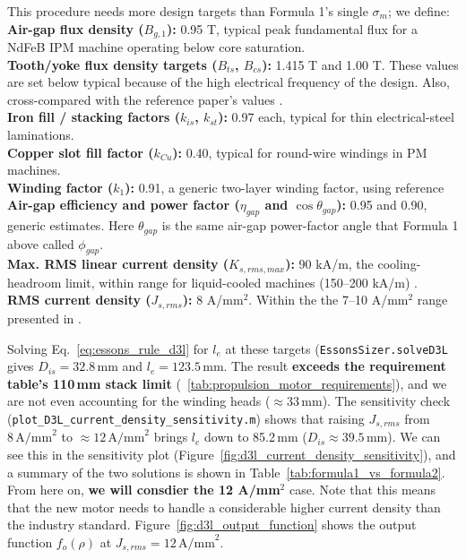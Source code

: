 \documentclass[10pt,final,journal,a4paper,oneside,twocolumn]{IEEEtran}
\begin{document}
This procedure needs more design targets than Formula 1's single $\sigma_m$; we define:
\\\textbf{Air-gap flux density ($B_{g,1}$):} 0.95 T, typical peak fundamental flux for a NdFeB IPM machine operating below core saturation.
\\\textbf{Tooth/yoke flux density targets ($B_{ts}$, $B_{cs}$):} 1.415 T and 1.00 T. These values are set below typical because of the high electrical frequency of the design. Also, cross-compared with the reference paper's values \cite{DiGerlandoRicca2022}.
\\\textbf{Iron fill / stacking factors ($k_{is}$, $k_{st}$):} 0.97 each, typical for thin electrical-steel laminations.
\\\textbf{Copper slot fill factor ($k_{Cu}$):} 0.40, typical for round-wire windings in PM machines.
\\\textbf{Winding factor ($k_1$):} 0.91, a generic two-layer winding factor, using reference
\\\textbf{Air-gap efficiency and power factor ($\eta_{gap}$ and $\cos\theta_{gap}$):} 0.95 and 0.90, generic estimates. Here $\theta_{gap}$ is the same air-gap power-factor angle that Formula 1 above called $\phi_{gap}$.
\\\textbf{Max. RMS linear current density ($K_{s,rms,max}$):} 90 kA/m, the cooling-headroom limit, within range for liquid-cooled machines (150--200 kA/m) \cite{LucaLecture6}.
\\\textbf{RMS current density ($J_{s,rms}$):} 8 A/mm$^2$. Within the the 7--10 A/mm$^2$ range presented in \cite{LucaLecture6}.

Solving Eq.~\ref{eq:essons_rule_d3l} for $l_e$ at these targets (\texttt{EssonsSizer.solveD3L} gives $D_{is}=32.8\,\text{mm}$ and $l_e=123.5\,\text{mm}$. The result \textbf{exceeds the requirement table's 110\,mm stack limit} (\tablename~\ref{tab:propulsion_motor_requirements}), and we are not even accounting for the winding heads ($\approx$33\,mm). The sensitivity check (\texttt{plot\_D3L\_current\_density\_sensitivity.m}) shows that raising $J_{s,rms}$ from $8\,\text{A/mm}^2$ to $\approx$$12\,\text{A/mm}^2$ brings $l_e$ down to 85.2\,mm  ($D_{is}\approx39.5\,\text{mm}$). We can see this in the sensitivity plot (Figure~\ref{fig:d3l_current_density_sensitivity}), and a summary of the two solutions is shown in Table~\ref{tab:formula1_vs_formula2}. From here on, \textbf{we will consdier the 12 A/mm$^2$} case. Note that this means that the new motor needs to handle a considerable higher current density than the industry standard.
Figure~\ref{fig:d3l_output_function} shows the output function $f_o(\rho)$ at $J_{s,rms} = 12\,\text{A/mm}^2$.
\end{document}

